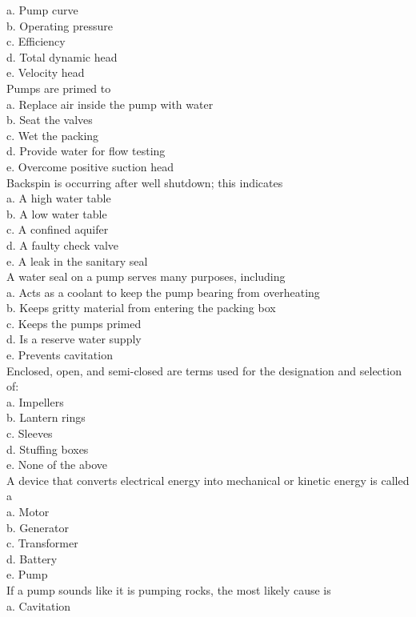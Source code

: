 a. Pump curve\\
b. Operating pressure\\
c. Efficiency\\
d. Total dynamic head\\
e. Velocity head\\
Pumps are primed to\\
a. Replace air inside the pump with water\\
b. Seat the valves\\
c. Wet the packing\\
d. Provide water for flow testing\\
e. Overcome positive suction head\\
Backspin is occurring after well shutdown; this indicates\\
a. A high water table\\
b. A low water table\\
c. A confined aquifer\\
d. A faulty check valve\\
e. A leak in the sanitary seal\\
A water seal on a pump serves many purposes, including\\
a. Acts as a coolant to keep the pump bearing from overheating\\
b. Keeps gritty material from entering the packing box\\
c. Keeps the pumps primed\\
d. Is a reserve water supply\\
e. Prevents cavitation\\
Enclosed, open, and semi-closed are terms used for the designation and selection of:\\
a. Impellers\\
b. Lantern rings\\
c. Sleeves\\
d. Stuffing boxes\\
e. None of the above \\
A device that converts electrical energy into mechanical or kinetic energy is called a\\
a. Motor\\
b. Generator\\
c. Transformer\\
d. Battery\\
e. Pump\\
If a pump sounds like it is pumping rocks, the most likely cause is\\
a. Cavitation\\
